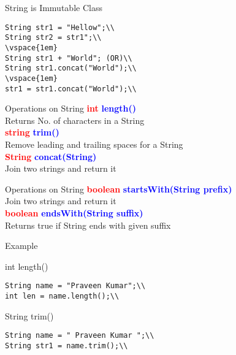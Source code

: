 \documentclass[aspectratio=169,14pt,usenames,dvipsnames]{beamer}
\begin{document}
\begin{frame}{String is Immutable Class}
\begin{lstlisting}
String str1 = "Hellow";\\
String str2 = str1";\\
\vspace{1em}
String str1 + "World"; (OR)\\
String str1.concat("World");\\
\vspace{1em}
str1 = str1.concat("World");\\
\end{lstlisting}
\end{frame}



\begin{frame}{Operations on String}
\textbf{\textcolor{red}{int}} \textbf{\textcolor{blue}{length()}} \\
Returns No. of characters in a String\\
\vspace{1em}
\textbf{\textcolor{red}{string}} \textbf{\textcolor{blue}{trim()}} \\
Remove leading and trailing spaces for a String\\
\vspace{1em}
\textbf{\textcolor{red}{String}} \textbf{\textcolor{blue}{concat(String)}} \\
Join two strings and return it\\
\end{frame}


\begin{frame}{Operations on String}
\textbf{\textcolor{red}{boolean}} \textbf{\textcolor{blue}{startsWith(String prefix)}} \\
Join two strings and return it\\
\vspace{1em}
\textbf{\textcolor{red}{boolean}} \textbf{\textcolor{blue}{endsWith(String suffix)}} \\
Returns true if String ends with given suffix\\
\end{frame}


\begin{frame}{Example}
\begin{block}{int length()}
\begin{lstlisting}
String name = "Praveen Kumar";\\
int len = name.length();\\
\end{lstlisting}
\end{block}
\begin{block}{String trim()}
\begin{lstlisting}
String name = " Praveen Kumar ";\\
String str1 = name.trim();\\
\end{lstlisting}
\end{block}
\end{frame}
\end{document}
